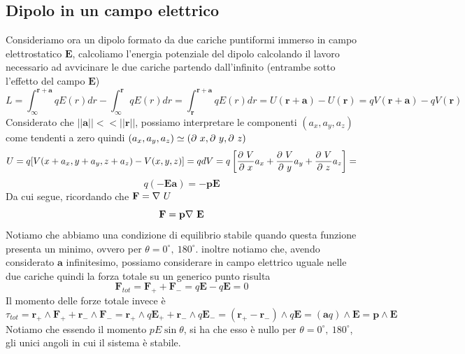 \documentclass[
10pt, %
a4paper, %
oneside, %
headinclude,footinclude, %
BCOR5mm, %
]{scrartcl}
\begin{document}
\subsection{Dipolo in un campo elettrico}
Consideriamo ora un dipolo formato da due cariche puntiformi immerso in campo elettrostatico $\mathbf{E}$, calcoliamo l'energia potenziale del dipolo calcolando il lavoro necessario ad avvicinare le due cariche partendo dall'infinito (entrambe sotto l'effetto del campo $\mathbf{E}$)
\[L = \int_{\infty}^{\mathbf{r}+\mathbf{a}} qE(r) dr -\int_{\infty}^{\mathbf{r}} qE(r) dr =\int_{\mathbf{r}}^{\mathbf{r}+\mathbf{a}} qE(r) dr= U(\mathbf{r}+\mathbf{a})-U(\mathbf{r}) = qV(\mathbf{r}+\mathbf{a})-qV(\mathbf{r})\]
Considerato che $||\mathbf{a}||<<||\mathbf{r}||$, possiamo interpretare le componenti \((a_x, a_y, a_z)\) come tendenti a zero quindi \((a_x, a_y, a_z)\simeq (\partial\  x, \partial\  y, \partial\  z)\)
\[U = q[V(x+a_x, y+a_y, z+a_z)-V(x, y, z)] = qdV = q\left[\frac{\partial\  V}{\partial\  x} a_x + \frac{\partial\  V}{\partial\  y}a_y + \frac{\partial\  V}{\partial\  z}a_z\right] =\]
\[ q(-\mathbf{E}\mathbf{a}) = -\mathbf{p}\mathbf{E}\]
Da cui segue, ricordando che \(\mathbf{F} = \mathbf{\nabla\ } U\)
\[\mathbf{F} = \mathbf{p}\mathbf{\nabla\ }\mathbf{E}\]
Notiamo che abbiamo una condizione di equilibrio stabile quando questa funzione presenta un minimo, ovvero per \(\theta= 0^\circ,\ 180^\circ\). inoltre notiamo che, avendo considerato $\mathbf{a}$ infinitesimo, possiamo considerare in campo elettrico uguale nelle due cariche quindi la forza totale su un generico punto risulta 
\[\mathbf{F}_{tot} =\mathbf{F}_++\mathbf{F}_- = q\mathbf{E}-q\mathbf{E} = 0\]
Il momento delle forze totale invece è
\[\tau_{tot} = \mathbf{r}_+\wedge\mathbf{F}_+ + \mathbf{r}_-\wedge\mathbf{F}_- = \mathbf{r}_+\wedge q\mathbf{E}_+ + \mathbf{r}_-\wedge q\mathbf{E}_- = (\mathbf{r}_+ - \mathbf{r}_-)\wedge q \mathbf{E} = (\mathbf{a}q)\wedge\mathbf{E} = \mathbf{p}\wedge\mathbf{E}\]
Notiamo che essendo il momento \(pE\sin\theta\), si ha che esso è nullo per \(\theta= 0^\circ,\ 180^\circ\), gli unici angoli in cui il sistema è stabile. 
\end{document}
